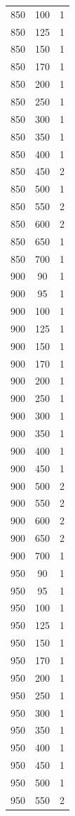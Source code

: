 \begin{longtable}{c c c}
850 & 100 & 1 \\
850 & 125 & 1 \\
850 & 150 & 1 \\
850 & 170 & 1 \\
850 & 200 & 1 \\
850 & 250 & 1 \\
850 & 300 & 1 \\
850 & 350 & 1 \\
850 & 400 & 1 \\
850 & 450 & 2 \\
850 & 500 & 1 \\
850 & 550 & 2 \\
850 & 600 & 2 \\
850 & 650 & 1 \\
850 & 700 & 1 \\
900 & 90 & 1 \\
900 & 95 & 1 \\
900 & 100 & 1 \\
900 & 125 & 1 \\
900 & 150 & 1 \\
900 & 170 & 1 \\
900 & 200 & 1 \\
900 & 250 & 1 \\
900 & 300 & 1 \\
900 & 350 & 1 \\
900 & 400 & 1 \\
900 & 450 & 1 \\
900 & 500 & 2 \\
900 & 550 & 2 \\
900 & 600 & 2 \\
900 & 650 & 2 \\
900 & 700 & 1 \\
950 & 90 & 1 \\
950 & 95 & 1 \\
950 & 100 & 1 \\
950 & 125 & 1 \\
950 & 150 & 1 \\
950 & 170 & 1 \\
950 & 200 & 1 \\
950 & 250 & 1 \\
950 & 300 & 1 \\
950 & 350 & 1 \\
950 & 400 & 1 \\
950 & 450 & 1 \\
950 & 500 & 1 \\
950 & 550 & 2 \\

\end{longtable}
